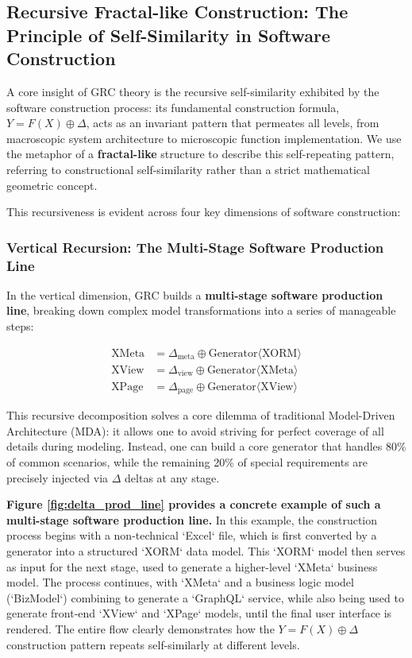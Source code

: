 \documentclass[11pt]{article}
\begin{document}
\subsection{Recursive Fractal-like Construction: The Principle of Self-Similarity in Software Construction}

A core insight of GRC theory is the recursive self-similarity exhibited by the software construction process: its fundamental construction formula, $Y = F(X) \oplus \Delta$, acts as an invariant pattern that permeates all levels, from macroscopic system architecture to microscopic function implementation. We use the metaphor of a \textbf{fractal-like} structure to describe this self-repeating pattern, referring to constructional self-similarity rather than a strict mathematical geometric concept.

This recursiveness is evident across four key dimensions of software construction:

\subsubsection{Vertical Recursion: The Multi-Stage Software Production Line}

In the vertical dimension, GRC builds a \textbf{multi-stage software production line}, breaking down complex model transformations into a series of manageable steps:

\begin{align*}
\text{XMeta} &= \Delta_{\text{meta}} \oplus \text{Generator}\langle\text{XORM}\rangle \\
\text{XView} &= \Delta_{\text{view}} \oplus \text{Generator}\langle\text{XMeta}\rangle \\
\text{XPage} &= \Delta_{\text{page}} \oplus \text{Generator}\langle\text{XView}\rangle
\end{align*}

This recursive decomposition solves a core dilemma of traditional Model-Driven Architecture (MDA): it allows one to avoid striving for perfect coverage of all details during modeling. Instead, one can build a core generator that handles 80\% of common scenarios, while the remaining 20\% of special requirements are precisely injected via $\Delta$ deltas at any stage.

\textbf{Figure \ref{fig:delta_prod_line} provides a concrete example of such a multi-stage software production line.} In this example, the construction process begins with a non-technical `Excel` file, which is first converted by a generator into a structured `XORM` data model. This `XORM` model then serves as input for the next stage, used to generate a higher-level `XMeta` business model. The process continues, with `XMeta` and a business logic model (`BizModel`) combining to generate a `GraphQL` service, while also being used to generate front-end `XView` and `XPage` models, until the final user interface is rendered. The entire flow clearly demonstrates how the $Y = F(X) \oplus \Delta$ construction pattern repeats self-similarly at different levels.
\end{document}

